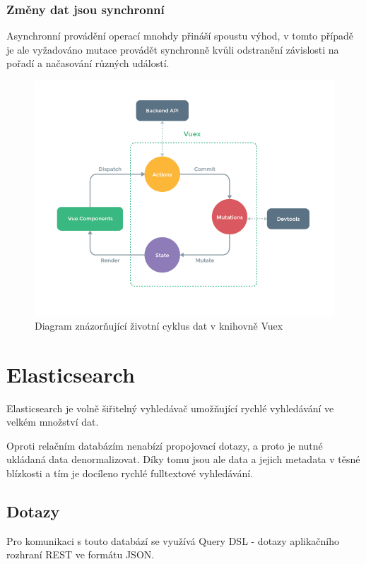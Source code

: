 
\subsubsection*{Změny dat jsou synchronní}
Asynchronní provádění operací mnohdy přináší spoustu výhod, v tomto případě je ale vyžadováno mutace provádět synchronně kvůli odstranění závislosti na pořadí a načasování různých událostí.


\begin{figure}[H]
	\centering
	\includegraphics[width=\textwidth]{images/vuex.png}
	\caption{Diagram znázorňující životní cyklus dat v knihovně Vuex}
	\label{vuex-dataflow}
\end{figure}

\blindtext

\section{Elasticsearch}
Elasticsearch je volně šiřitelný vyhledávač umožňující rychlé vyhledávání ve velkém množství dat. 

Oproti relačním databázím nenabízí propojovací dotazy, a proto je nutné ukládaná data denormalizovat. Díky tomu jsou ale data a jejich metadata v těsné blízkosti a tím je docíleno rychlé fulltextové vyhledávání. %

\subsection{Dotazy}
Pro komunikaci s touto databází se využívá Query DSL - dotazy aplikačního rozhraní REST ve formátu JSON.

